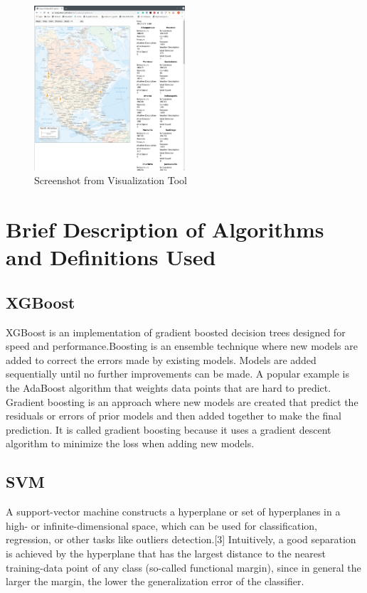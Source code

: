 \documentclass[10pt]{article}
\begin{document}
\begin{figure}[H]
    \centering
    \includegraphics[width=0.5\textwidth]{../res/screenshot.png}
    \caption{Screenshot from Visualization Tool}
\end{figure}
\section{Brief Description of Algorithms and Definitions Used}
\subsection{XGBoost}
XGBoost is an implementation of gradient boosted decision trees designed
for speed and performance.Boosting is an ensemble technique where new
models are added to correct the errors made by existing models. Models are
added sequentially until no further improvements can be made. A popular
example is the AdaBoost algorithm that weights data points that are hard
to predict. Gradient boosting is an approach where new models are created
that predict the residuals or errors of prior models and then added
together to make the final prediction. It is called gradient boosting
because it uses a gradient descent algorithm to minimize the loss when
adding new models.\par
\subsection{SVM}
A support-vector machine constructs a hyperplane or set of hyperplanes in a
high- or infinite-dimensional space, which can be used for classification,
regression, or other tasks like outliers detection.[3] Intuitively, a good
separation is achieved by the hyperplane that has the largest distance to
the nearest training-data point of any class (so-called functional margin),
since in general the larger the margin, the lower the generalization error
of the classifier.\par
\end{document}
